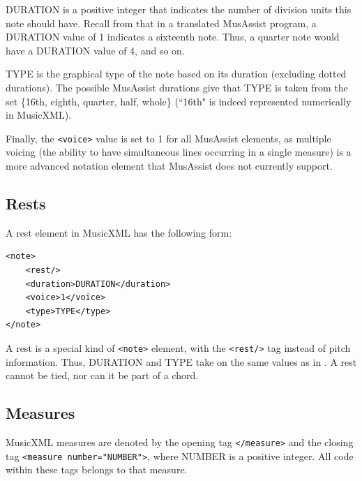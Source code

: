 \documentclass{report}
\begin{document}
DURATION is a positive integer that indicates the number of division units this note should have. Recall from  that in a translated MusAssist program, a DURATION value of 1 indicates a sixteenth note. Thus, a quarter note would have a DURATION value of 4, and so on.

TYPE is the graphical type of the note based on its duration (excluding dotted durations). The possible MusAssist durations give that TYPE is taken from the set \{16th, eighth, quarter, half,  whole\} (``16th" is indeed represented numerically in MusicXML).

Finally, the \verb.<voice>. value is set to 1 for all MusAssist elements, as multiple voicing (the ability to have simultaneous lines occurring in a single measure) is a more advanced notation element that MusAssist does not currently support. 

\subsection{Rests}
\label{sec:xmlrest}

A rest element in MusicXML has the following form:
\begin{verbatim}
<note>
    <rest/>
    <duration>DURATION</duration>
    <voice>1</voice>
    <type>TYPE</type>
</note>
\end{verbatim}

A rest is a special kind of \verb.<note>. element, with the \verb.<rest/>. tag instead of pitch information. Thus, DURATION and TYPE take on the same values as in . A rest cannot be tied, nor can it be part of a chord.

\subsection{Measures}
\label{sec:xmlmeasure}
MusicXML measures are denoted by the opening tag \verb.</measure>. and the closing tag \verb.<measure number="NUMBER">., where NUMBER is a positive integer. All code within these tags belongs to that measure.

\end{document}
